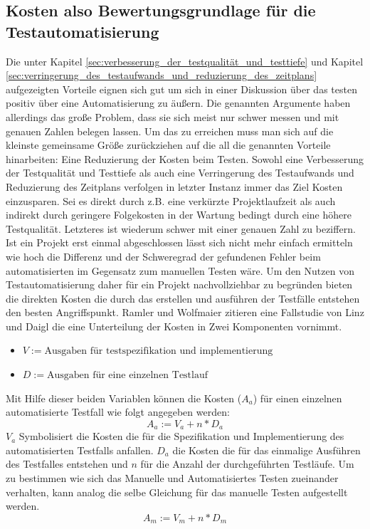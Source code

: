 \subsection{Kosten also Bewertungsgrundlage für die Testautomatisierung}
\label{sec:kosten_der_testautomatisierung}
Die unter Kapitel \ref{sec:verbesserung_der_testqualität_und_testtiefe} und Kapitel \ref{sec:verringerung_des_testaufwands_und_reduzierung_des_zeitplans} aufgezeigten Vorteile eignen sich gut um sich in einer Diskussion über das testen positiv über eine Automatisierung zu äußern. Die genannten Argumente haben allerdings das große Problem, dass sie sich meist nur schwer messen und mit genauen Zahlen belegen lassen.
Um das zu erreichen muss man sich auf die kleinste gemeinsame Größe zurückziehen auf die all die genannten Vorteile hinarbeiten: Eine Reduzierung der Kosten beim Testen.
Sowohl eine Verbesserung der Testqualität und Testtiefe als auch eine Verringerung des Testaufwands und Reduzierung des Zeitplans verfolgen in letzter Instanz immer das Ziel Kosten einzusparen. Sei es direkt durch z.B. eine verkürzte Projektlaufzeit als auch indirekt durch geringere Folgekosten in der Wartung bedingt durch eine höhere Testqualität.
Letzteres ist wiederum schwer mit einer genauen Zahl zu beziffern. Ist ein Projekt erst einmal abgeschlossen lässt sich nicht mehr einfach ermitteln wie hoch die Differenz und der Schweregrad der gefundenen Fehler beim automatisierten im Gegensatz zum manuellen Testen wäre.
Um den Nutzen von Testautomatisierung daher für ein Projekt nachvollziehbar zu begründen bieten die direkten Kosten die durch das erstellen und ausführen der Testfälle entstehen den besten Angriffspunkt. \cite{ramler_economic_2006}
Ramler und Wolfmaier \cite{ramler_economic_2006} zitieren eine Fallstudie von Linz und Daigl \cite{dustin_automated_1999} die eine Unterteilung der Kosten in Zwei Komponenten vornimmt.
\begin{itemize}
    \item[] \(V:=\text{Ausgaben für testspezifikation und implementierung}\)
    \item[] \(D:=\text{Ausgaben für eine einzelnen Testlauf}\)
\end{itemize}

Mit Hilfe dieser beiden Variablen können die Kosten (\(A_a\)) für einen einzelnen automatisierte Testfall wie folgt angegeben werden:
\begin{equation}
A_a:=V_a+n*D_a
\end{equation}
\(V_a\) Symbolisiert die Kosten die für die Spezifikation und Implementierung des automatisierten Testfalls anfallen. \(D_a\) die Kosten die für das einmalige Ausführen des Testfalles entstehen und \(n\) für die Anzahl der durchgeführten Testläufe.
Um zu bestimmen wie sich das Manuelle und Automatisiertes Testen zueinander verhalten, kann analog die selbe Gleichung für das manuelle Testen aufgestellt werden.
\begin{equation}
A_m:=V_m+n*D_m
\end{equation}

